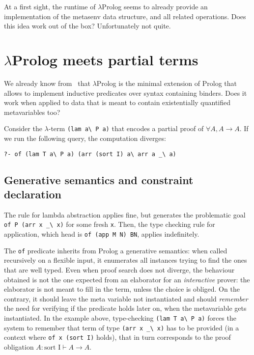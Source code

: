 \documentclass{easychair}
\begin{document}
At a first sight, the runtime of $\lambda$Prolog seems to already provide
an implementation of the metasenv data structure, and all related operations.
Does this idea work out of the box? Unfortunately not quite.

\section{$\lambda$Prolog meets partial terms}

We already know from~\cite{jlp98} that $\lambda$Prolog is the minimal
extension of Prolog that allows to implement inductive predicates over
syntax containing binders. Does it work when applied to data that is
meant to contain existentially quantified metavariables too?

Consider the $\lambda$-term \verb+(lam a\ P a)+ that encodes a
partial proof of $\forall A, A \to A$.
If we run the following query, the computation diverges:

\begin{Verbatim}
?- of (lam T a\ P a) (arr (sort I) a\ arr a _\ a)
\end{Verbatim}

\subsection{Generative semantics and constraint declaration} %
\label{sec:delay}

The rule for lambda abstraction applies fine, but generates the problematic
goal \verb+of P (arr x _\ x)+ for some fresh \verb+x+.  Then, the type checking
rule for application, which head is \verb+of (app M N) BN+, applies
indefinitely.  

The \verb+of+ predicate inherits from Prolog a generative semantics:
when called recursively on a flexible input, it enumerates all
instances trying to find the ones that are well typed. Even when proof
search does not diverge, the behaviour obtained is not the one
expected from an elaborator for an \emph{interactive} prover: the
elaborator is not meant to fill in the term, unless the choice is
obliged. On the contrary, it should leave the meta variable not
instantiated and should \emph{remember} the need for verifying if the
predicate holds later on, when the metavariable gets instantiated. In
the example above, type-checking \verb+(lam T a\ P a)+ forces the
system to remember that term of type \verb+(arr x _\ x)+ has to be
provided (in a context where \verb+of x (sort I)+ holds), that in turn
corresponds to the proof obligation $A : \mbox{sort I} \vdash A \to A $.
\end{document}
